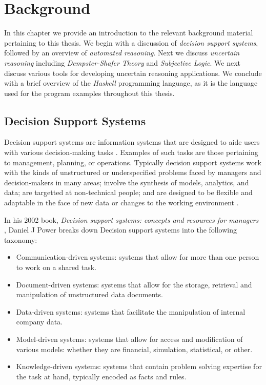 \documentclass[thesis.tex]{subfiles}
\begin{document}
\chapter{Background}
\label{chap:background-information}

In this chapter we provide an introduction to the relevant background material pertaining
to this thesis. We begin with a discussion of \emph{decision support systems}, followed by
an overview of \emph{automated reasoning}. Next we discuss \emph{uncertain reasoning} including \emph{Dempster-Shafer Theory} and
\emph{Subjective Logic}. We next discuss various tools for developing uncertain reasoning applications. We conclude with
a brief overview of the \emph{Haskell} programming language, as it is the language used for the program
examples throughout this thesis.



\section{Decision Support Systems}
\label{sec:dss}

Decision support systems are information systems that are designed to aide users with various
decision-making tasks \cite{sprague1980framework}. Examples of such tasks are those pertaining to management,
planning, or operations. Typically decision support systems work with the kinds of unstructured
or underspecified problems faced by managers and decision-makers in many areas; involve the
synthesis of models, analytics, and data; are targetted at non-technical people; and are designed
to be flexible and adaptable in the face of new data or changes to the working environment
\cite{sprague1980framework}.

In his 2002 book, \emph{Decision support systems: concepts and resources for managers}
\cite{power2002decision}, Daniel J Power breaks down Decision support systems into the following
taxonomy:

\begin{itemize}
  \item Communication-driven systems: systems that allow for more than
    one person to work on a shared task.
  \item Document-driven systems: systems that allow for the storage,
    retrieval and manipulation of unstructured data documents.
  \item Data-driven systems: systems that facilitate the manipulation
    of internal company data.
  \item Model-driven systems: systems that allow for access and
    modification of various models: whether they are financial,
    simulation, statistical, or other.
  \item Knowledge-driven systems: systems that contain problem solving
    expertise for the task at hand, typically encoded as facts and
    rules.
\end{itemize}
\end{document}
